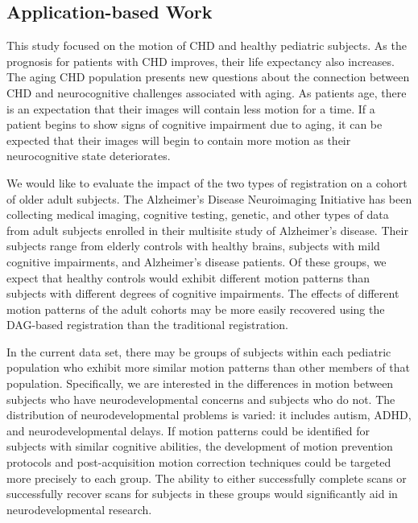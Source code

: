 \subsection{Application-based Work}

This study focused on the motion of CHD and healthy pediatric subjects. As the prognosis for patients with CHD improves, their life expectancy also increases. The aging CHD population presents new questions about the connection between CHD and neurocognitive challenges associated with aging. As patients age, there is an expectation that their images will contain less motion for a time. If a patient begins to show signs of cognitive impairment due to aging, it can be expected that their images will begin to contain more motion as their neurocognitive state deteriorates. 

We would like to evaluate the impact of the two types of registration on a cohort of older adult subjects. The Alzheimer's Disease Neuroimaging Initiative has been collecting medical imaging, cognitive testing, genetic, and other types of data from adult subjects enrolled in their multisite study of Alzheimer's disease. Their subjects range from elderly controls with healthy brains, subjects with mild cognitive impairments, and Alzheimer's disease patients. Of these groups, we expect that healthy controls would exhibit different motion patterns than subjects with different degrees of cognitive impairments. The effects of different motion patterns of the adult cohorts may be more easily recovered using the DAG-based registration than the traditional registration.

In the current data set, there may be groups of subjects within each pediatric population who exhibit more similar motion patterns than other members of that population. Specifically, we are interested in the differences in motion between subjects who have neurodevelopmental concerns and subjects who do not. The distribution of neurodevelopmental problems is varied: it includes autism, ADHD, and neurodevelopmental delays. If motion patterns could be identified for subjects with similar cognitive abilities, the development of motion prevention protocols and post-acquisition motion correction techniques could be targeted more precisely to each group. The ability to either successfully complete scans or successfully recover scans for subjects in these groups would significantly aid in neurodevelopmental research.


